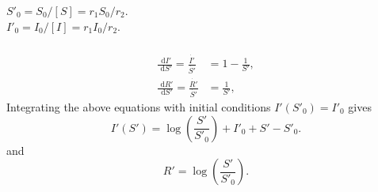 \documentclass[]{article}
\newcommand{\bb}{\begin{equation}}
\newcommand{\ee}{\end{equation}}
\newcommand{\rd}{\text{ d}}
\renewcommand{\l}{\left(}
\renewcommand{\r}{\right)}
\begin{document}
\begin{Answ}
\subsubsection{}
$S'_0=S_0/[S]=r_1S_0/r_2.$\\
$I'_0=I_0/[I]=r_1I_0/r_2.$

\subsubsection{}
\begin{align}
\frac{\rd I'}{\rd S'}=\frac{\dot{I'}}{\dot{S'}}&=1-\frac{1}{S'},\nonumber\\
\frac{\rd R'}{\rd S'}=\frac{\dot{R'}}{\dot{S'}}&=\frac{1}{S'},\nonumber
\end{align}
Integrating the above equations with initial conditions $I'(S'_0)=I'_0$ gives
\bb
I'(S') = \log\l \frac{S'}{S'_0}\r+I'_0+S'-S'_0.
\ee
and
\bb
R'=\log\l \frac{S'}{S'_0}\r.
\ee
\end{Answ}
\end{document}
